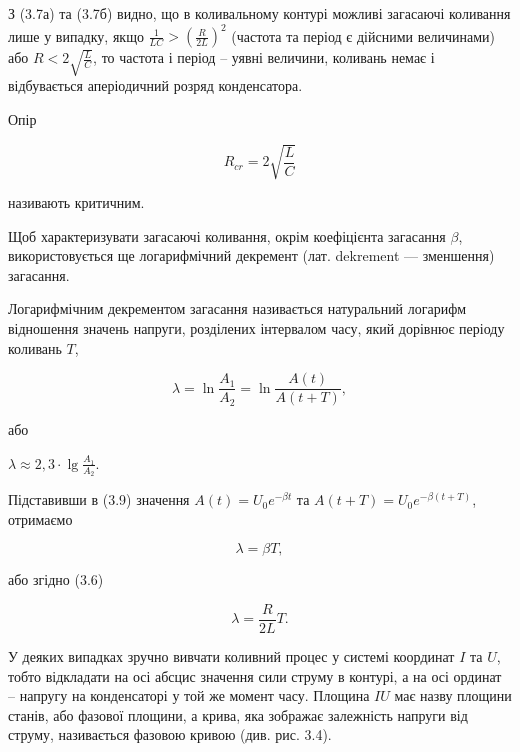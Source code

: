 \documentclass[12pt,a4paper]{article}
\begin{document}
    З (3.7а) та (3.7б) видно, що в коливальному контурі можливі загасаючі коливання лише у випадку,
    якщо $\displaystyle \frac{1}{LC} > \left( \frac{R}{2L}\right)^2$ (частота та період є дійсними величинами)
    або $\displaystyle R < 2\sqrt{\frac{L}{C}}$, то частота і період – уявні величини, коливань немає і відбувається
    аперіодичний розряд конденсатора.

    Опір

    \begin{equation}
        R_{cr} = 2\sqrt{\frac{L}{C}}
        \tag{3.8}
    \end{equation}

    називають критичним.

    Щоб характеризувати загасаючі коливання, окрім коефіцієнта загасання $\beta$,
    використовується ще логарифмічний декремент (лат. dekrement --- зменшення) загасання.

    Логарифмічним декрементом загасання називається натуральний логарифм
    відношення значень напруги, розділених інтервалом часу,
    який дорівнює періоду коливань $T$,

    \begin{equation}
        \lambda = \ln \frac{A_1}{A_2} = \ln \frac{A(t)}{A(t+T)},
        \tag{3.9}
    \end{equation}

    або

    \begin{center}
        $\displaystyle \lambda \approx 2,3\cdot \lg \frac{A_1}{A_2}$.
    \end{center}

    Підставивши в (3.9) значення $A(t) = U_0e^{-\beta t}$ та $A(t+T) = U_0e^{-\beta (t+T)}$, отримаємо

    \begin{equation}
        \lambda = \beta T,
        \tag{3.10}
    \end{equation}

    або згідно (3.6)

    \begin{equation}
        \lambda = \frac{R}{2L}T.
        \tag{3.10а}
    \end{equation}

    У деяких випадках зручно вивчати коливний процес у системі координат $I$ та $U$,
    тобто відкладати на осі абсцис значення сили струму в контурі,
    а на осі ординат -- напругу на конденсаторі у той же момент часу.
    Площина $IU$ має назву площини станів, або фазової площини, а крива,
    яка зображає залежність напруги від струму, називається фазовою кривою (див. рис. 3.4).
\end{document}

